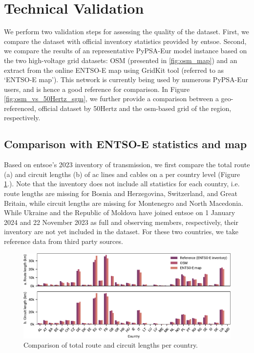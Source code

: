 \documentclass[fleqn,10pt]{wlscirep}
\let\autocite\cite
\begin{document}
\newpage
\newpage
\section*{Technical Validation}
We perform two validation steps for assessing the quality of the dataset. First, we compare the dataset with official inventory statistics provided by \acrshort{entsoe}. Second, we compare the results of an representative PyPSA-Eur model instance based on the two high-voltage grid datasets: OSM (presented in \ref{fig:osm_map}) and an extract from the online ENTSO-E map using GridKit tool (referred to as ‘ENTSO-E map’).\autocite{wiegmansGridKitExtractENTSOE2016} This network is currently being used by numerous PyPSA-Eur users, and is hence a good reference for comparison. In Figure \ref{fig:osm_vs_50Hertz_sgm}, we further provide a comparison between a geo-referenced, official dataset by 50Hertz\autocite{50hertzStaticGridModel2022} and the \acrshort{osm}-based grid of the region, respectively.

\subsection*{Comparison with ENTSO-E statistics and map}
Based on \acrshort{entsoe}'s 2023 inventory of transmission,\autocite{entso-eInventoryTransmission20232024} we first compare the total route (a) and circuit lengths (b) of \acrshort{ac} lines and cables on a per country level (Figure \ref{fig:bar_lengths}.). Note that the inventory does not include all statistics for each country, i.e. route lengths are missing for Bosnia and Herzegovina, Switzerland, and Great Britain, while circuit lengths are missing for Montenegro and North Macedonia. While Ukraine and the Republic of Moldova have joined \acrshort{entsoe} on 1 January 2024 and 22 November 2023 as full and observing members, respectively, their inventory are not yet included in the dataset. For these two countries, we take reference data from third party sources.\autocite{cigrePowerSystemUkraine2018,globaldataTopFiveTransmission2023,moldelectricaTechnicalEconomicIndicators2023}

\begin{figure}[!htbp]
    \centering
    \includegraphics{figures/fig_bar_lengths.pdf}
    \caption{Comparison of total route and circuit lengths per country.}
    \label{fig:bar_lengths}
\end{figure}
\end{document}
